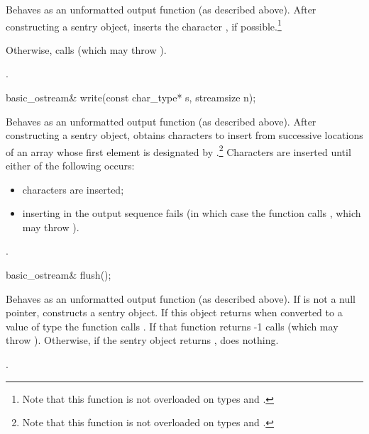 \begin{itemdescr}
\pnum
\effects
Behaves as an unformatted output function (as described above).
After constructing a sentry
object, inserts
the character , if possible.\footnote{Note that this function is not overloaded on types
and
.}

\pnum
Otherwise, calls
(which may throw
).

\pnum
\returns
{}.
\end{itemdescr}

%
\begin{itemdecl}
basic_ostream& write(const char_type* s, streamsize n);
\end{itemdecl}

\begin{itemdescr}
\pnum
\effects
Behaves as an unformatted output function (as described above).  After constructing a sentry
object, obtains
characters to insert from
successive locations of an array whose first element is designated by
.\footnote{Note that this function is not overloaded on types
and
.}
Characters are inserted until either of the following occurs:
\begin{itemize}
\item
{} characters are inserted;
\item
inserting in the output sequence fails
(in which case the function calls
,
which may throw
).
\end{itemize}

\pnum
\returns
{}.
\end{itemdescr}

%
\begin{itemdecl}
basic_ostream& flush();
\end{itemdecl}

\begin{itemdescr}
\pnum
\effects
Behaves as an unformatted output function (as described above).
If
is not a null pointer,
constructs a sentry object. If this object returns  when converted to a value of type  the function
calls
.
If that function returns -1
calls
(which may throw
).
Otherwise, if the sentry object returns , does nothing.

\pnum
\returns
{}.
\end{itemdescr}

